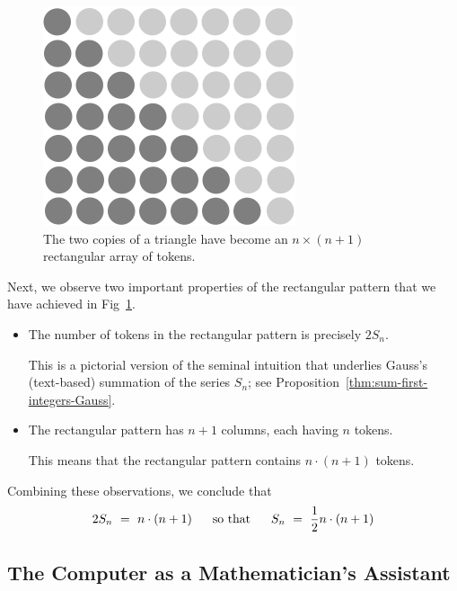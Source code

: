 \begin{figure}[ht]
\begin{center}
       \includegraphics[scale=0.35]{FiguresMaths/SumIntegersFinal}
\caption{The two copies of a triangle have become an $n \times (n+1)$
  rectangular array of tokens.}
       \label{fig:sumIntegers3}
\end{center}
\end{figure}
Next, we observe two important properties of the rectangular pattern that we have achieved in Fig~\ref{fig:sumIntegers3}.
\begin{itemize}
\item
The number of tokens in the rectangular pattern is precisely $2 S_n$.

\smallskip

This is a pictorial version of the seminal intuition that underlies Gauss's (text-based) summation of the series $S_n$; see Proposition~\ref{thm:sum-first-integers-Gauss}.

\item
The rectangular pattern has $n+1$ columns, each having $n$ tokens.

\smallskip

This means that the rectangular pattern contains $n \cdot (n+1)$ tokens.
\end{itemize}
Combining these observations, we conclude that
\[ 2 S_n \ = \ n \cdot (n+1) \ \ \ \ \mbox{ so that } \ \ \ \
S_n \ = \ {1 \over 2} n \cdot (n+1)
\]


\subsection{The Computer as a Mathematician's Assistant}

